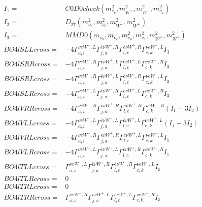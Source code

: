 \documentclass[A4,landscape]{article}
\begin{document}
\begin{align} 
I_1 = & C0D0check(m^2_{\nu_{{c}}}, m^2_{W^+}, m^2_{W^+}, m^2_{\nu_{{a}}}) \\ 
I_2 = & D_{27}(m^2_{\nu_{{a}}}, m^2_{\nu_{{c}}}, m^2_{W^+}, m^2_{W^+}) \\ 
I_3 = & MMD0(m_{\nu_{{a}}}, m_{\nu_{{c}}}, m^2_{\nu_{{a}}}, m^2_{\nu_{{c}}}, m^2_{W^+}, m^2_{W^+}) \\ 
  BO4lSLLcross= & -4  \Gamma^{\nu e W^-,L}_{a, i} \Gamma^{\bar{e}\nu W^+ ,R}_{j, a} \Gamma^{\bar{e}\nu W^+ ,R}_{l, c} \Gamma^{\nu e W^-,L}_{c, k} I_3 \\ 
  BO4lSRRcross= & -4  \Gamma^{\nu e W^-,R}_{a, i} \Gamma^{\bar{e}\nu W^+ ,L}_{j, a} \Gamma^{\bar{e}\nu W^+ ,L}_{l, c} \Gamma^{\nu e W^-,R}_{c, k} I_3 \\ 
  BO4lSRLcross= & -4  \Gamma^{\nu e W^-,R}_{a, i} \Gamma^{\bar{e}\nu W^+ ,L}_{j, a} \Gamma^{\bar{e}\nu W^+ ,R}_{l, c} \Gamma^{\nu e W^-,L}_{c, k} I_3 \\ 
  BO4lSLRcross= & -4  \Gamma^{\nu e W^-,L}_{a, i} \Gamma^{\bar{e}\nu W^+ ,R}_{j, a} \Gamma^{\bar{e}\nu W^+ ,L}_{l, c} \Gamma^{\nu e W^-,R}_{c, k} I_3 \\ 
  BO4lVRRcross= & -4  \Gamma^{\nu e W^-,R}_{a, i} \Gamma^{\bar{e}\nu W^+ ,R}_{j, a} \Gamma^{\bar{e}\nu W^+ ,R}_{l, c} \Gamma^{\nu e W^-,R}_{c, k} (I_1 - 3 I_2) \\ 
  BO4lVLLcross= & -4  \Gamma^{\nu e W^-,L}_{a, i} \Gamma^{\bar{e}\nu W^+ ,L}_{j, a} \Gamma^{\bar{e}\nu W^+ ,L}_{l, c} \Gamma^{\nu e W^-,L}_{c, k} (I_1 - 3 I_2) \\ 
  BO4lVRLcross= & -4  \Gamma^{\nu e W^-,R}_{a, i} \Gamma^{\bar{e}\nu W^+ ,R}_{j, a} \Gamma^{\bar{e}\nu W^+ ,L}_{l, c} \Gamma^{\nu e W^-,L}_{c, k} I_1 \\ 
  BO4lVLRcross= & -4  \Gamma^{\nu e W^-,L}_{a, i} \Gamma^{\bar{e}\nu W^+ ,L}_{j, a} \Gamma^{\bar{e}\nu W^+ ,R}_{l, c} \Gamma^{\nu e W^-,R}_{c, k} I_1 \\ 
  BO4lTLLcross= &  \Gamma^{\nu e W^-,L}_{a, i} \Gamma^{\bar{e}\nu W^+ ,R}_{j, a} \Gamma^{\bar{e}\nu W^+ ,R}_{l, c} \Gamma^{\nu e W^-,L}_{c, k} I_3 \\ 
  BO4lTLRcross= & 0 \\ 
  BO4lTRLcross= & 0 \\ 
  BO4lTRRcross= &  \Gamma^{\nu e W^-,R}_{a, i} \Gamma^{\bar{e}\nu W^+ ,L}_{j, a} \Gamma^{\bar{e}\nu W^+ ,L}_{l, c} \Gamma^{\nu e W^-,R}_{c, k} I_3 \\ 
\end{align} 
\end{document}
